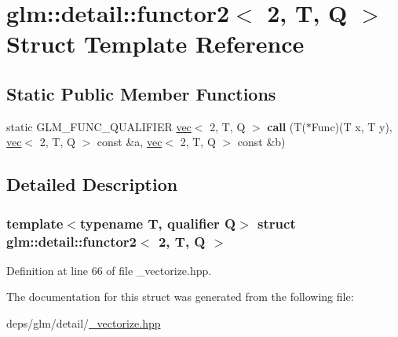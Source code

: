 \hypertarget{structglm_1_1detail_1_1functor2_3_012_00_01T_00_01Q_01_4}{}\section{glm\+:\+:detail\+:\+:functor2$<$ 2, T, Q $>$ Struct Template Reference}
\label{structglm_1_1detail_1_1functor2_3_012_00_01T_00_01Q_01_4}
\subsection*{Static Public Member Functions}
\begin{DoxyCompactItemize}
\item 
\mbox{\label{structglm_1_1detail_1_1functor2_3_012_00_01T_00_01Q_01_4_a861cd8867e8703fae7ff738403a9b50d}} 
static G\+L\+M\+\_\+\+F\+U\+N\+C\+\_\+\+Q\+U\+A\+L\+I\+F\+I\+ER \hyperlink{structglm_1_1vec}{vec}$<$ 2, T, Q $>$ {\bfseries call} (T($\ast$Func)(T x, T y), \hyperlink{structglm_1_1vec}{vec}$<$ 2, T, Q $>$ const \&a, \hyperlink{structglm_1_1vec}{vec}$<$ 2, T, Q $>$ const \&b)
\end{DoxyCompactItemize}


\subsection{Detailed Description}
\subsubsection*{template$<$typename T, qualifier Q$>$\newline
struct glm\+::detail\+::functor2$<$ 2, T, Q $>$}



Definition at line 66 of file \+\_\+vectorize.\+hpp.



The documentation for this struct was generated from the following file\+:\begin{DoxyCompactItemize}
\item 
deps/glm/detail/\hyperlink{__vectorize_8hpp}{\+\_\+vectorize.\+hpp}\end{DoxyCompactItemize}
